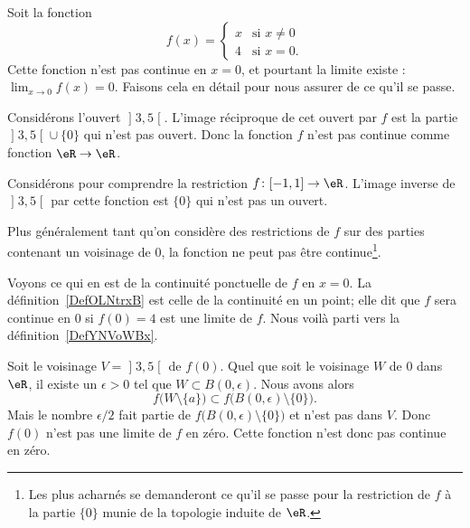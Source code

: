 \begin{example}     \label{EXooKREUooLeuIlv}
    Soit la fonction
    \begin{equation}        \label{EQooSYSWooSGsUfR}
        f(x)=\begin{cases}
            x    &   \text{si } x\neq 0\\
            4    &    \text{si } x=0.
        \end{cases}
    \end{equation}
    Cette fonction n'est pas continue en \( x=0\), et pourtant la limite existe : \( \lim_{x\to 0} f(x)=0\). Faisons cela en détail pour nous assurer de ce qu'il se passe.

    Considérons l'ouvert \( \mathopen] 3 , 5 \mathclose[\). L'image réciproque de cet ouvert par \( f\) est la partie \( \mathopen] 3 , 5 \mathclose[\cup\{ 0 \}\) qui n'est pas ouvert. Donc la fonction \( f\) n'est pas continue comme fonction \( \eR\to \eR\).

    Considérons pour comprendre la restriction \( f\colon \mathopen[ -1 , 1 \mathclose]\to \eR\). L'image inverse de \( \mathopen] 3 , 5 \mathclose[\) par cette fonction est \( \{ 0 \}\) qui n'est pas un ouvert.

    Plus généralement tant qu'on considère des restrictions de \( f\) sur des parties contenant un voisinage de \( 0\), la fonction ne peut pas être continue\footnote{Les plus acharnés se demanderont ce qu'il se passe pour la restriction de \( f\) à la partie \( \{ 0 \}\) munie de la topologie induite de $\eR$.}.

    Voyons ce qui en est de la continuité ponctuelle de \( f\) en \( x=0\). La définition~\ref{DefOLNtrxB} est celle de la continuité en un point; elle dit que \( f\) sera continue en \( 0\) si \( f(0)=4\) est une limite de \( f\). Nous voilà parti vers la définition~\ref{DefYNVoWBx}.

Soit le voisinage \( V=\mathopen] 3 , 5 \mathclose[\) de \( f(0)\). Quel que soit le voisinage \( W\) de \( 0\) dans \( \eR\), il existe un \( \epsilon>0\) tel que \( W\subset B(0,\epsilon)\). Nous avons alors
    \begin{equation}
        f\big( W\setminus \{ a \} \big)\subset f\big( B(0,\epsilon)\setminus\{ 0 \} \big).
    \end{equation}
    Mais le nombre \( \epsilon/2\) fait partie de \( f\big( B(0,\epsilon)\setminus\{ 0 \} \big)\) et n'est pas dans \( V\). Donc \( f(0)\) n'est pas une limite de \( f\) en zéro. Cette fonction n'est donc pas continue en zéro.
\end{example}

